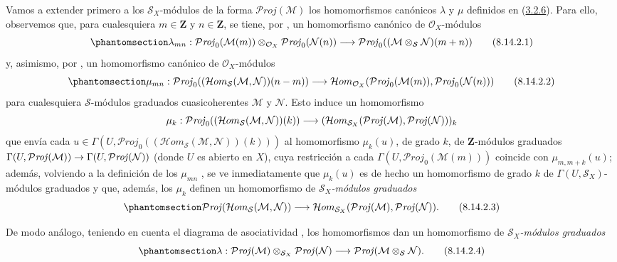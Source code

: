 \documentclass[oneside,10pt]{amsart}
\makeatletter
\newcommand{\ega@arrow}[2]{\mathchoice{#1}{#2}{#2}{#2}}
\renewcommand{\to}{\ega@arrow{\longrightarrow}{\rightarrow}}
\newcommand{\oldpage}[2][]{\marginnote{\normalfont\footnotesize\textbf{#1}~|~#2}\ignorespaces}
\let\EGAOriginalLabel\label
\renewcommand{\label}[1]{\phantomsection\EGAOriginalLabel{#1}}
\makeatother
\begin{document}
\begin{env}[8.14.2]
\label{II.8.14.2-fr}
Vamos a extender primero a los $\mathcal{S}_X$-módulos de la forma $\mathcal{P}\mathit{roj}(\mathcal{M})$ los homomorfismos canónicos $\lambda$ y $\mu$ definidos en (\hyperref[II.3.2.6-fr]{3.2.6}).
Para ello, observemos que, para cualesquiera $m\in\mathbf{Z}$ y $n\in\mathbf{Z}$, se tiene, por , un homomorfismo canónico de $\mathcal{O}_X$-módulos
\begin{equation}
\label{II.8.14.2.1-fr}
  \lambda_{mn}:\mathcal{P}\mathit{roj}_0(\mathcal{M}(m))
  \otimes_{\mathcal{O}_X}\mathcal{P}\mathit{roj}_0(\mathcal{N}(n))
  \to\mathcal{P}\mathit{roj}_0
  ((\mathcal{M}\otimes_{\mathcal{S}}\mathcal{N})(m+n))
\tag{8.14.2.1}
\end{equation}
y, asimismo, por , un homomorfismo canónico de $\mathcal{O}_X$-módulos
\begin{equation}
\label{II.8.14.2.2-fr}
  \mu_{mn}:\mathcal{P}\mathit{roj}_0
  ((\mathcal{H}om_{\mathcal{S}}(\mathcal{M},\mathcal{N}))(n-m))
  \to\mathcal{H}om_{\mathcal{O}_X}
  (\mathcal{P}\mathit{roj}_0(\mathcal{M}(m)),
   \mathcal{P}\mathit{roj}_0(\mathcal{N}(n)))
\tag{8.14.2.2}
\end{equation}
para cualesquiera $\mathcal{S}$-módulos graduados cuasicoherentes $\mathcal{M}$ y $\mathcal{N}$.
Esto induce un homomorfismo
\[
  \mu_k:\mathcal{P}\mathit{roj}_0
  ((\mathcal{H}om_{\mathcal{S}}(\mathcal{M},\mathcal{N}))(k))
  \to
  (\mathcal{H}om_{\mathcal{S}_X}
  (\mathcal{P}\mathit{roj}(\mathcal{M}),\mathcal{P}\mathit{roj}(\mathcal{N})))_k
\]
que envía cada $u\in\Gamma(U,\mathcal{P}\mathit{roj}_0
((\mathcal{H}om_{\mathcal{S}}(\mathcal{M},\mathcal{N}))(k)))$ al homomorfismo $\mu_k(u)$, de grado $k$, de $\mathbf{Z}$-módulos graduados $\Gamma(U,\mathcal{P}\mathit{roj}(\mathcal{M}))\to
\Gamma(U,\mathcal{P}\mathit{roj}(\mathcal{N}))$ (donde $U$ es abierto en $X$), cuya restricción a cada $\Gamma(U,\mathcal{P}\mathit{roj}_0(\mathcal{M}(m)))$ coincide con $\mu_{m,m+k}(u)$;
además, volviendo a la definición de los $\mu_{mn}$ , se ve inmediatamente que $\mu_k(u)$ es de hecho un homomorfismo de grado $k$ de $\Gamma(U,\mathcal{S}_X)$-módulos graduados y que, además, los $\mu_k$ definen un homomorfismo de \emph{$\mathcal{S}_X$-módulos graduados}
\begin{equation}
\label{II.8.14.2.3-fr}
  \mathcal{P}\mathit{roj}
  (\mathcal{H}om_{\mathcal{S}}(\mathcal{M},\mathcal{N}))
  \to\mathcal{H}om_{\mathcal{S}_X}
  (\mathcal{P}\mathit{roj}(\mathcal{M}),\mathcal{P}\mathit{roj}(\mathcal{N})).
\tag{8.14.2.3}
\end{equation}

De modo análogo, teniendo en cuenta el diagrama de asociatividad , los homomorfismos  dan un homomorfismo de \emph{$\mathcal{S}_X$-módulos graduados}
\begin{equation}
\label{II.8.14.2.4-fr}
  \lambda:\mathcal{P}\mathit{roj}(\mathcal{M})
  \otimes_{\mathcal{S}_X}\mathcal{P}\mathit{roj}(\mathcal{N})
  \to\mathcal{P}\mathit{roj}(\mathcal{M}\otimes_{\mathcal{S}}\mathcal{N}).
\tag{8.14.2.4}
\end{equation}
\end{env}
\oldpage[II]{198}
\end{document}
